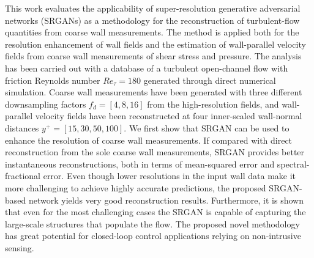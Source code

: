 \begin{paper}

\makepapertitle

%
\begin{paperabstract}
This work evaluates the applicability of super-resolution generative adversarial networks (SRGANs) as a methodology for the reconstruction of turbulent-flow quantities from coarse wall measurements.
The method is applied both for the resolution enhancement of wall fields and the estimation of wall-parallel velocity fields from coarse wall measurements of shear stress and pressure.
The analysis has been carried out with a database of a turbulent open-channel flow with friction Reynolds number $Re_{\tau}=180$ generated through direct numerical simulation.
Coarse wall measurements have been generated with three different downsampling factors $f_d=[4,8,16]$ from the high-resolution fields, and wall-parallel velocity fields have been reconstructed at four inner-scaled wall-normal distances $y^+=[15,30,50,100]$.
We first show that SRGAN can be used to enhance the resolution of coarse wall measurements.
If compared with direct reconstruction from the sole coarse wall measurements, SRGAN provides better instantaneous reconstructions, both in terms of mean-squared error and spectral-fractional error.
Even though lower resolutions in the input wall data make it more challenging to achieve highly accurate predictions, the proposed SRGAN-based network yields very good reconstruction results.
Furthermore, it is shown that even for the most challenging cases the SRGAN is capable of capturing the large-scale structures that populate the flow.
The proposed novel methodology has great potential for closed-loop control applications relying on non-intrusive sensing.
\end{paperabstract}


%



%


%


\end{paper}
